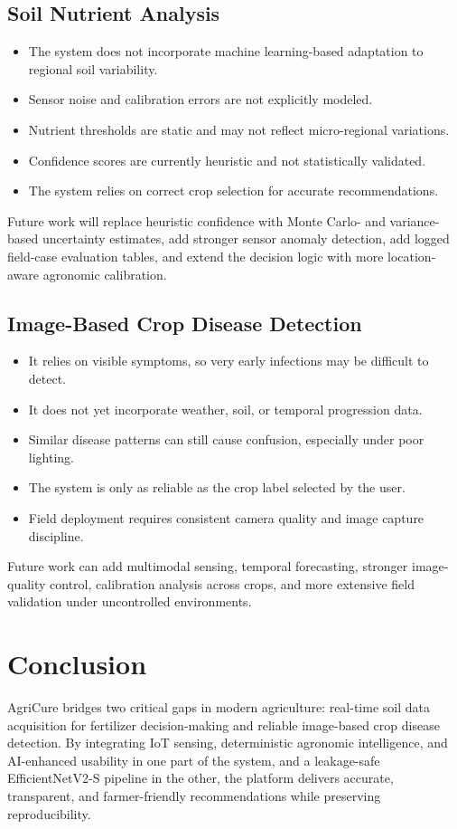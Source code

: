 \documentclass[conference]{IEEEtran}
\begin{document}
\subsection{Soil Nutrient Analysis}
\begin{itemize}
\item The system does not incorporate machine learning-based adaptation to regional soil variability.
\item Sensor noise and calibration errors are not explicitly modeled.
\item Nutrient thresholds are static and may not reflect micro-regional variations.
\item Confidence scores are currently heuristic and not statistically validated.
\item The system relies on correct crop selection for accurate recommendations.
\end{itemize}
Future work will replace heuristic confidence with Monte Carlo- and variance-based uncertainty estimates, add stronger sensor anomaly detection, add logged field-case evaluation tables, and extend the decision logic with more location-aware agronomic calibration.

\subsection{Image-Based Crop Disease Detection}
\begin{itemize}
\item It relies on visible symptoms, so very early infections may be difficult to detect.
\item It does not yet incorporate weather, soil, or temporal progression data.
\item Similar disease patterns can still cause confusion, especially under poor lighting.
\item The system is only as reliable as the crop label selected by the user.
\item Field deployment requires consistent camera quality and image capture discipline.
\end{itemize}
Future work can add multimodal sensing, temporal forecasting, stronger image-quality control, calibration analysis across crops, and more extensive field validation under uncontrolled environments.

\section{Conclusion}
AgriCure bridges two critical gaps in modern agriculture: real-time soil data acquisition for fertilizer decision-making and reliable image-based crop disease detection. By integrating IoT sensing, deterministic agronomic intelligence, and AI-enhanced usability in one part of the system, and a leakage-safe EfficientNetV2-S pipeline in the other, the platform delivers accurate, transparent, and farmer-friendly recommendations while preserving reproducibility.
\end{document}
